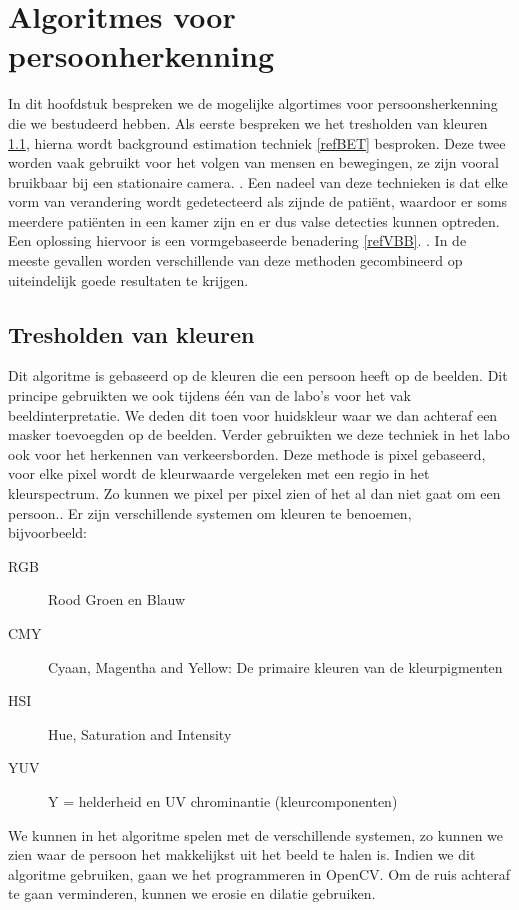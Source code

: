 \section{Algoritmes voor persoonherkenning}
\label{refAVPH}
In dit hoofdstuk bespreken we de mogelijke algortimes voor persoonsherkenning die we bestudeerd hebben. Als eerste bespreken we het tresholden van kleuren \ref{refTVK}, hierna wordt background estimation techniek \ref{refBET} besproken. Deze twee worden vaak gebruikt voor het volgen van mensen en bewegingen, ze zijn vooral bruikbaar bij een stationaire camera. \cite{bibIRC}. Een nadeel van deze technieken is dat elke vorm van verandering wordt gedetecteerd als zijnde de pati\"ent, waardoor er soms meerdere pati\"enten in een kamer zijn en er dus valse detecties kunnen optreden. Een oplossing hiervoor is een vormgebaseerde benadering \ref{refVBB}. \cite{bibIRC}. In de meeste gevallen worden verschillende van deze methoden gecombineerd op uiteindelijk goede resultaten te krijgen. 

\subsection{Tresholden van kleuren}
\label{refTVK}
Dit algoritme is gebaseerd op de kleuren die een persoon heeft op de beelden. Dit principe gebruikten we ook tijdens \'e\'en van de labo's voor het vak beeldinterpretatie. We deden dit toen voor huidskleur waar we dan achteraf een masker toevoegden op de beelden. Verder gebruikten we deze techniek in het labo ook voor het herkennen van verkeersborden. Deze methode is pixel gebaseerd, voor elke pixel wordt de kleurwaarde vergeleken met een regio in het kleurspectrum. Zo kunnen we pixel per pixel zien of het al dan niet gaat om een persoon.\cite{bibTHK}. Er zijn verschillende systemen om kleuren te benoemen,\\ bijvoorbeeld:
\begin{description}
	\item[RGB] Rood Groen en Blauw
	\item [CMY] Cyaan, Magentha and Yellow: De primaire kleuren van de kleurpigmenten
	\item [HSI] Hue, Saturation and Intensity
	\item [YUV] Y = helderheid en UV chrominantie (kleurcomponenten)
\end{description}
We kunnen in het algoritme spelen met de verschillende systemen, zo kunnen we zien waar de persoon het makkelijkst uit het beeld te halen is. Indien we dit algoritme gebruiken, gaan we het programmeren in OpenCV. Om de ruis achteraf te gaan verminderen, kunnen we erosie en dilatie gebruiken. 

